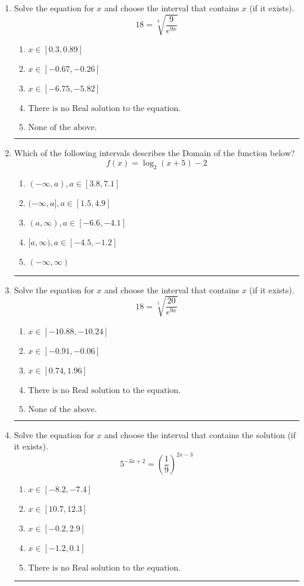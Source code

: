 \documentclass[14pt]{extbook}
\newcommand{\litem}[1]{\item#1\hspace*{-1cm}\rule{\textwidth}{0.4pt}}
\begin{document}
\begin{enumerate}
{\begin{enumerate}[label=\Alph*.]
\end{enumerate} }
\litem{
 Solve the equation for $x$ and choose the interval that contains $x$ (if it exists).\[  18 = \sqrt[3]{\frac{9}{e^{9x}}} \]\begin{enumerate}[label=\Alph*.]
\item \( x \in [0.3, 0.89] \)
\item \( x \in [-0.67, -0.26] \)
\item \( x \in [-6.75, -5.82] \)
\item \( \text{There is no Real solution to the equation.} \)
\item \( \text{None of the above.} \)

\end{enumerate} }
\litem{
Which of the following intervals describes the Domain of the function below?\[ f(x) = \log_2{(x+5)}-2 \]\begin{enumerate}[label=\Alph*.]
\item \( (-\infty, a), a \in [3.8, 7.1] \)
\item \( (-\infty, a], a \in [1.5, 4.9] \)
\item \( (a, \infty), a \in [-6.6, -4.1] \)
\item \( [a, \infty), a \in [-4.5, -1.2] \)
\item \( (-\infty, \infty) \)

\end{enumerate} }
\litem{
 Solve the equation for $x$ and choose the interval that contains $x$ (if it exists).\[  18 = \sqrt[5]{\frac{20}{e^{9x}}} \]\begin{enumerate}[label=\Alph*.]
\item \( x \in [-10.88, -10.24] \)
\item \( x \in [-0.91, -0.06] \)
\item \( x \in [0.74, 1.96] \)
\item \( \text{There is no Real solution to the equation.} \)
\item \( \text{None of the above.} \)

\end{enumerate} }
\litem{
Solve the equation for $x$ and choose the interval that contains the solution (if it exists).\[ 5^{-3x+2} = \left(\frac{1}{9}\right)^{2x-3} \]\begin{enumerate}[label=\Alph*.]
\item \( x \in [-8.2, -7.4] \)
\item \( x \in [10.7, 12.3] \)
\item \( x \in [-0.2, 2.9] \)
\item \( x \in [-1.2, 0.1] \)
\item \( \text{There is no Real solution to the equation.} \)


\end{enumerate}}
\end{enumerate}
\end{document}
